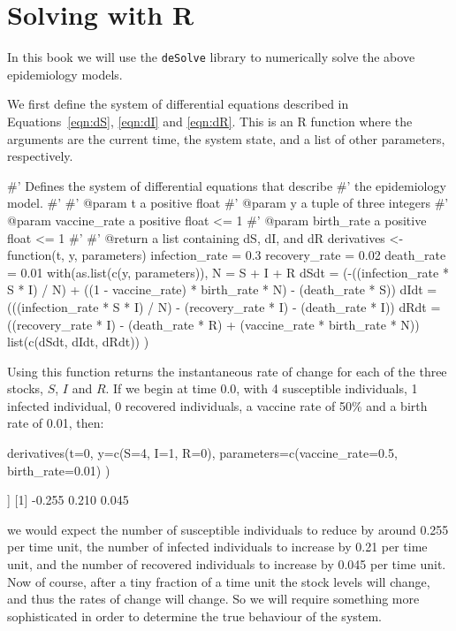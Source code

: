 \section{Solving with R}\label{sec:solving-with-R}
In this book we will use the \texttt{deSolve} library to numerically
solve the above epidemiology models.

We first define the system of differential equations described in
Equations~\ref{eqn:dS}, \ref{eqn:dI} and \ref{eqn:dR}. This is an R function
where the arguments are the current time, the system state, and a list of other
parameters, respectively.

\begin{Rin}
#' Defines the system of differential equations that describe
#' the epidemiology model.
#'
#' @param t a positive float
#' @param y a tuple of three integers
#' @param vaccine_rate a positive float <= 1
#' @param birth_rate a positive float <= 1
#'
#' @return a list containing dS, dI, and dR
derivatives <- function(t, y, parameters){
  infection_rate = 0.3
  recovery_rate = 0.02
  death_rate = 0.01
  with(as.list(c(y, parameters)), {
    N = S + I + R
    dSdt = (-((infection_rate * S * I) / N)
           + ((1 - vaccine_rate) * birth_rate * N)
           - (death_rate * S))
    dIdt = (((infection_rate * S * I) / N)
           - (recovery_rate * I)
           - (death_rate * I))
    dRdt = ((recovery_rate * I)
           - (death_rate * R)
           + (vaccine_rate * birth_rate * N))
    list(c(dSdt, dIdt, dRdt))
})
}
\end{Rin}

Using this function returns the instantaneous rate of change for each of the
three stocks, $S$, $I$ and $R$. If we begin at time 0.0, with 4 susceptible
individuals, 1 infected individual, 0 recovered individuals, a vaccine rate
of 50\% and a birth rate of 0.01, then:

\begin{Rin}
derivatives(t=0,
            y=c(S=4, I=1, R=0),
            parameters=c(vaccine_rate=0.5, birth_rate=0.01)
)
\end{Rin}

\begin{Rout}
[[1]]
[1] -0.255  0.210  0.045

\end{Rout}

we would expect the number of susceptible individuals to reduce by around 0.255
per time unit, the number of infected individuals to increase by 0.21 per time
unit, and the number of recovered individuals to increase by 0.045 per time
unit. Now of course, after a tiny fraction of a time unit the stock levels will
change, and thus the rates of change will change. So we will require something
more sophisticated in order to determine the true behaviour of the system.

